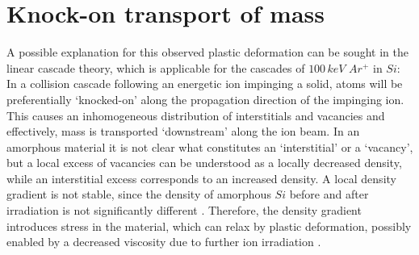 \section{Knock-on transport of mass}

A possible explanation for this observed plastic deformation can be sought in the linear cascade theory, which is applicable for the cascades of $100\,keV\,\,Ar^+$ in $Si$: In a collision cascade following an energetic ion impinging a solid, atoms will be preferentially `knocked-on' along the propagation direction of the impinging ion. This causes an inhomogeneous distribution of interstitials and vacancies and effectively, mass is transported `downstream' along the ion beam. In an amorphous material it is not clear what constitutes an `interstitial' or a `vacancy', but a local excess of vacancies can be understood as a locally decreased density, while an interstitial excess corresponds to an increased density. A local density gradient is not stable, since the density of amorphous $Si$ before and after irradiation is not significantly different \cite{pelaz_ion-beam-induced_2004}. Therefore, the density gradient introduces stress in the material, which can relax by plastic deformation, possibly enabled by a decreased viscosity due to further ion irradiation \cite{snoeks_stress_1997,hu_burrowing_2002,mayr_mechanisms_2003,mayr_effect_2003}. 

